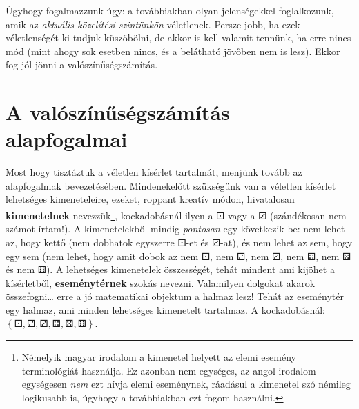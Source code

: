 \documentclass[magyar,]{book}
\let\rmarkdownfootnote\footnote%
\def\footnote{\protect\rmarkdownfootnote}
\begin{document}
Úgyhogy fogalmazzunk úgy: a továbbiakban olyan jelenségekkel foglalkozunk, amik az \emph{aktuális közelítési szintünkön} véletlenek. Persze jobb, ha ezek véletlenségét ki tudjuk küszöbölni, de akkor is kell valamit tennünk, ha erre nincs mód (mint ahogy sok esetben nincs, és a belátható jövőben nem is lesz). Ekkor fog jól jönni a valószínűségszámítás.

\hypertarget{a-valuxf3szuxednux171suxe9gszuxe1muxedtuxe1s-alapfogalmai}{%
\section{A valószínűségszámítás alapfogalmai}\label{a-valuxf3szuxednux171suxe9gszuxe1muxedtuxe1s-alapfogalmai}}

Most hogy tisztáztuk a véletlen kísérlet tartalmát, menjünk tovább az alapfogalmak bevezetésében. Mindenekelőtt szükségünk van a véletlen kísérlet lehetséges kimeneteleire, ezeket, roppant kreatív módon, hivatalosan \textbf{kimenetelnek} nevezzük\footnote{Némelyik magyar irodalom a kimenetel helyett az elemi esemény terminológiát használja. Ez azonban nem egységes, az angol irodalom egységesen \emph{nem} ezt hívja elemi eseménynek, ráadásul a kimenetel szó némileg logikusabb is, úgyhogy a továbbiakban ezt fogom használni.}, kockadobásnál ilyen a ⚀ vagy a ⚂ (szándékosan nem számot írtam!). A kimenetelekből mindig \emph{pontosan} egy következik be: nem lehet az, hogy kettő (nem dobhatok egyszerre ⚀-et és ⚂-at), és nem lehet az sem, hogy egy sem (nem lehet, hogy amit dobok az nem ⚀, nem ⚁, nem ⚂, nem ⚃, nem ⚄ és nem ⚅). A lehetséges kimenetelek összességét, tehát mindent ami kijöhet a kísérletből, \textbf{eseménytérnek} szokás nevezni. Valamilyen dolgokat akarok összefogni\ldots{} erre a jó matematikai objektum a halmaz lesz! Tehát az eseménytér egy halmaz, ami minden lehetséges kimenetelt tartalmaz. A kockadobásnál: \(\left\{⚀,⚁,⚂,⚃,⚄,⚅\right\}\).
\end{document}
